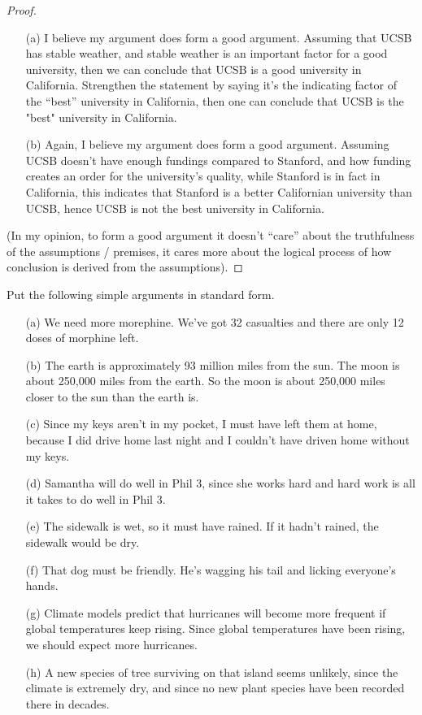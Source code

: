\documentclass{article}
\begin{document}
\begin{proof}

    \hfil

    \begin{itemize}
        \item[(a)] I believe my argument does form a good argument. Assuming that UCSB has stable weather, and stable weather is an important factor for a good university, then we can conclude that UCSB is a good university in California. Strengthen the statement by saying it's the indicating factor of the ``best'' university in California, then one can conclude that UCSB is the "best" university in California.
        \item[(b)] Again, I believe my argument does form a good argument. Assuming UCSB doesn't have enough fundings compared to Stanford, and how funding creates an order for the university's quality, while Stanford is in fact in California, this indicates that Stanford is a better Californian university than UCSB, hence UCSB is not the best university in California.
    \end{itemize}

    (In my opinion, to form a good argument it doesn't ``care'' about the truthfulness of the assumptions / premises, it cares more about the logical process of how conclusion is derived from the assumptions).
\end{proof}

\hfil

\begin{ques}
    Put the following simple arguments in standard form.
    \begin{itemize}
        \item[(a)] We need more morephine. We've got 32 casualties and there are only 12 doses of morphine left.
        \item[(b)] The earth is approximately 93 million miles from the sun. The moon is about 250,000 miles from the earth. So the moon is about 250,000 miles closer to the sun than the earth is.
        \item[(c)] Since my keys aren't in my pocket, I must have left them at home, because I did drive home last night and I couldn't have driven home without my keys.
        \item[(d)] Samantha will do well in Phil 3, since she works hard and hard work is all it takes to do well in Phil 3.
        \item[(e)] The sidewalk is wet, so it must have rained. If it hadn't rained, the sidewalk would be dry.
        \item[(f)] That dog must be friendly. He's wagging his tail and licking everyone's hands.
        \item[(g)] Climate models predict that hurricanes will become more frequent if global temperatures keep rising. Since global temperatures have been rising, we should expect more hurricanes.
        \item[(h)] A new species of tree surviving on that island seems unlikely, since the climate is extremely dry, and since no new plant species have been recorded there in decades.       
    \end{itemize}
\end{ques}\label{q3}
\end{document}
